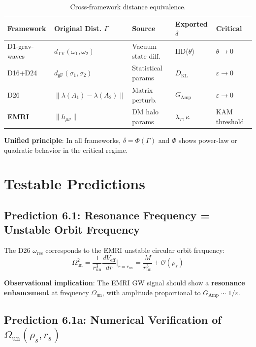 \documentclass[12pt]{article}
\begin{document}
\begin{table}[H]
\centering
\begin{tabular}{l l l l l}
\toprule
\textbf{Framework} & \textbf{Original Dist. $\Gamma$} & \textbf{Source} & \textbf{Exported $\delta$} & \textbf{Critical} \\
\midrule
D1-grav-waves & $d_{\text{TV}}(\omega_1, \omega_2)$ & Vacuum state diff. & HD($\theta$) & $\theta \to 0$ \\
D16+D24 & $d_{\text{gF}}(\sigma_1, \sigma_2)$ & Statistical params & $D_{\text{KL}}$ & $\varepsilon \to 0$ \\
D26 & $\|\lambda(A_1)-\lambda(A_2)\|$ & Matrix perturb. & $G_{\text{Amp}}$ & $\varepsilon \to 0$ \\
\textbf{EMRI} & $\|h_{\mu\nu}\|$ & DM halo params & $\lambda_T, \kappa$ & KAM threshold \\
\bottomrule
\end{tabular}
\caption{Cross-framework distance equivalence.}
\label{tab:cross}
\end{table}

\textbf{Unified principle}: In all frameworks, $\delta = \Phi(\Gamma)$ and $\Phi$ shows power-law or quadratic behavior in the critical regime.

\section{Testable Predictions}

\subsection{Prediction 6.1: Resonance Frequency = Unstable Orbit Frequency}

The D26 $\omega_{\text{res}}$ corresponds to the EMRI unstable circular orbit frequency:
\begin{equation}
\Omega_{\text{un}}^2 = \frac{1}{r_{\text{un}}^3} \frac{dV_{\text{eff}}}{dr}\bigg|_{r=r_{\text{un}}} = \frac{M}{r_{\text{un}}^3} + \mathcal{O}(\rho_s)
\end{equation}

\textbf{Observational implication}: The EMRI GW signal should show a \textbf{resonance enhancement} at frequency $\Omega_{\text{un}}$, with amplitude proportional to $G_{\text{Amp}} \sim 1/\varepsilon$.

\subsection{Prediction 6.1a: Numerical Verification of $\Omega_{\text{un}}(\rho_s, r_s)$}
\end{document}
